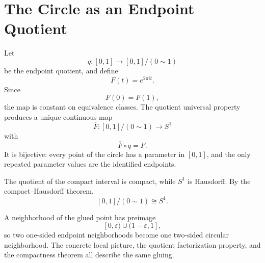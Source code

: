 \section{The Circle as an Endpoint Quotient}

Let
\[
  q:[0,1]\to[0,1]/(0\sim1)
\]
be the endpoint quotient, and define
\[
  F(t)=e^{2\pi it}.
\]
Since
\[
  F(0)=F(1),
\]
the map is constant on equivalence classes.  The quotient universal property produces a unique continuous map
\[
  \overline F:[0,1]/(0\sim1)\to S^1
\]
with
\[
  \overline F\circ q=F.
\]
It is bijective: every point of the circle has a parameter in \([0,1]\), and the only repeated parameter values are the identified endpoints.

The quotient of the compact interval is compact, while \(S^1\) is Hausdorff.  By the compact--Hausdorff theorem,
\[
  \boxed{
  [0,1]/(0\sim1)\cong S^1.}
\]

A neighborhood of the glued point has preimage
\[
  [0,\varepsilon)\cup(1-\varepsilon,1],
\]
so two one-sided endpoint neighborhoods become one two-sided circular neighborhood.  The concrete local picture, the quotient factorization property, and the compactness theorem all describe the same gluing.